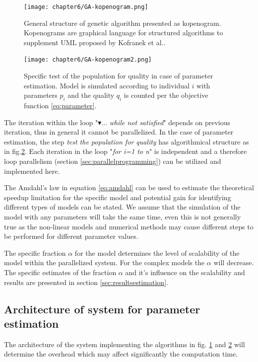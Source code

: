 \begin{figure}[htb]
    \centering
    \texttt{[image: chapter6/GA-kopenogram.png]}
    \caption{General structure of genetic algorithm presented as kopenogram. Kopenograms are graphical language for structured algorithms to supplement UML proposed by Kofranek et al.\cite{Kofranek2012}.
    }
    \label{fig:GA-kopenogram}
\end{figure}


\begin{figure}[htb]
    \centering
    \texttt{[image: chapter6/GA-kopenogram2.png]}
    \caption{Specific test of the population for quality in case of parameter estimation. Model is simulated according to individual $i$ with parameters $p_i$ and the quality $q_i$ is counted per the objective function \ref{eq:parameter}.
    }
    \label{fig:GA-kopenogram2}
\end{figure}

The iteration within the loop "$\blacktriangledown \ldots$ \emph{while not satisfied}" depends on previous iteration, thus in general it cannot be parallelized.
In the case of parameter estimation, the step \emph{test the population for quality} has algorithmical structure as in fig.\ref{fig:GA-kopenogram2}. Each iteration in the loop "\emph{for i=1 to n}" is independent and a therefore loop parallelism (section \ref{sec:parallelprogramming}) can be utilized and implemented here.

The Amdahl's law in equation \ref{eq:amdahl} can be used to estimate  the theoretical speedup limitation for the specific model and potential gain for identifying different types of models can be stated. We assume that the simulation of the model with any parameters will take the same time, even this is not generally true as the non-linear models and numerical methods may cause different steps to be performed for different parameter values. 

The specific fraction $\alpha$ for the model determines the level of scalability of the model within the parallelized system. For the complex models the $\alpha$ will decrease. The specific estimates of the fraction $\alpha$ and it's influence on the scalability and results are presented in section \ref{sec:resultsestimation}.

\subsection{Architecture of system for parameter estimation}

The architecture of the system implementing the algorithms in fig. \ref{fig:GA-kopenogram} and \ref{fig:GA-kopenogram2} will determine the overhead which may affect significantly the computation time.


